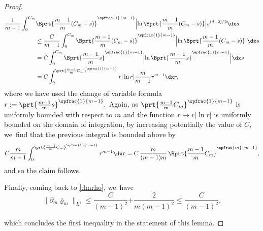 \begin{proof}
\begin{align*}
\frac{1}{m-1}\int_0^{C_m} & \Bprt{\frac{m-1}{m}(C_m -s)}^{\spfrac{1}{m-1}} \Bigl|\ln \Bprt{\frac{m-1}{m}(C_m -s)} \Bigr| s^{(d-2)/2} \dx s\\
& \le \frac{C}{m-1}\int_0^{C_m} \Bprt{\frac{m-1}{m}(C_m -s)}^{\spfrac{1}{m-1}} \Bigl|\ln \Bprt{\frac{m-1}{m}(C_m -s)} \Bigr| \dx s\\
& = C\int_0^{C_m} \Bprt{\frac{m-1}{m}s}^{\spfrac{1}{m-1}} \Bigl|\ln \Bprt{\frac{m-1}{m}s}^{\spfrac{1}{m-1}} \Bigr| \dx s\\
& = C\int_0^{\prt{\frac{m-1}{m}C_{m}}^{\spfrac{1}{m-1}}} r |\ln r| \frac{m}{m-1} r^{m-1}\dx r,
\end{align*}
where we have used the change of variable formula $r:=\prt{\frac{m-1}{m}s}^{\spfrac{1}{m-1}}.$ Again, as $\prt{\frac{m-1}{m}C_{m}}^{\spfrac{1}{m-1}}$ is uniformly bounded with respect to $m$ and the function $r\mapsto r |\ln r|$ is uniformly bounded on the domain of integration, by increasing potentially the value of $C$, we~find that the previous integral is bounded above by
\begin{align*}
C\frac{m}{m-1} \int_0^{\prt{\frac{m-1}{m}C_{m}}^{\spfrac{1}{m-1}}} r^{m-1}\dx r = C\,\frac{m}{(m-1)m}\, \Bprt{\frac{m-1}{m}C_{m}}^{\spfrac{m}{m-1}},
\end{align*}
and so the claim follows.

Finally, coming back to \eqref{dmrho}, we~have
\begin{equation}\label{rate l1}
\|\partial_m \bar\varrho_m\|_{L^1}\leq \frac{C}{(m-1)^2}{+ \frac{2}{m(m-1)^2} \leq \frac{C}{(m-1)^2}},
\end{equation}
{ which concludes the first inequality in the statement of this lemma.

}
\end{proof}

